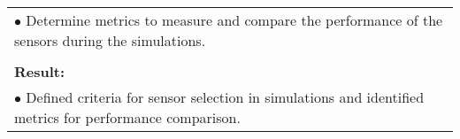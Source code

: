 \begin{table}[!h]
\begin{center}
\begin{tabular}{|p{35mm}||p{55mm}|p{50mm}||p{40mm}|}
      \multicolumn{4}{|p{150mm}|}{$\bullet$ Determine metrics to measure and compare the performance of the sensors during the simulations.} \\
      \multicolumn{4}{|p{150mm}|}{}                                                                                                                                                                           \\
      \multicolumn{4}{|p{150mm}|}{\textbf{Result:}}                                                                                                                                                       \\
      \multicolumn{4}{|p{150mm}|}{$\bullet$  Defined criteria for sensor selection in simulations and identified metrics for performance comparison.}                                                                                                                          \\
      \hline                                                                                                                                                                      
    \end{tabular}
  \end{center}
\end{table}

\clearpage

\clearpage

